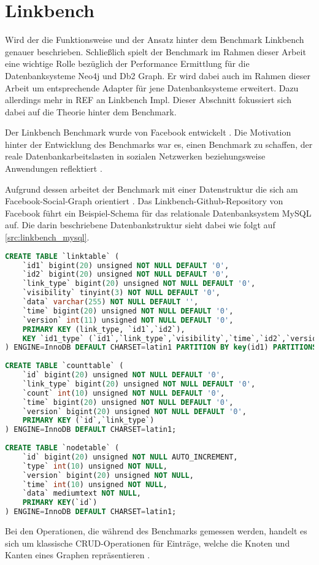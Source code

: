\section{Linkbench}

Wird der die Funktionsweise und der Ansatz hinter dem Benchmark Linkbench genauer beschrieben. Schließlich spielt der Benchmark im Rahmen dieser Arbeit eine wichtige Rolle bezüglich der Performance Ermittlung für die Datenbanksysteme Neo4j und Db2 Graph. Er wird dabei auch im Rahmen dieser Arbeit um entsprechende Adapter für jene Datenbanksysteme erweitert. Dazu allerdings mehr in REF an Linkbench Impl. Dieser Abschnitt fokussiert sich dabei auf die Theorie hinter dem Benchmark. 

Der Linkbench Benchmark wurde von Facebook entwickelt \cite{linkbench_paper}. Die Motivation hinter der Entwicklung des Benchmarks war es, einen Benchmark zu schaffen, der reale Datenbankarbeitslasten in sozialen Netzwerken beziehungsweise Anwendungen reflektiert \cite{linkbench_paper}. 

Aufgrund dessen arbeitet der Benchmark mit einer Datenstruktur die sich am Facebook-Social-Graph orientiert \cite{linkbench_paper}. Das Linkbench-Github-Repository von Facebook führt ein Beispiel-Schema für das relationale Datenbanksystem MySQL auf. Die darin beschriebene Datenbankstruktur sieht dabei wie folgt auf \autoref{src:linkbench_mysql}. 

\begin{lstlisting}[caption={Linkbench MySQL-Schema},language=SQL,label=src:linkbench_mysql]
CREATE TABLE `linktable` (
    `id1` bigint(20) unsigned NOT NULL DEFAULT '0',
    `id2` bigint(20) unsigned NOT NULL DEFAULT '0',
    `link_type` bigint(20) unsigned NOT NULL DEFAULT '0',
    `visibility` tinyint(3) NOT NULL DEFAULT '0',
    `data` varchar(255) NOT NULL DEFAULT '',
    `time` bigint(20) unsigned NOT NULL DEFAULT '0',
    `version` int(11) unsigned NOT NULL DEFAULT '0',
    PRIMARY KEY (link_type, `id1`,`id2`),
    KEY `id1_type` (`id1`,`link_type`,`visibility`,`time`,`id2`,`version`,`data`)
) ENGINE=InnoDB DEFAULT CHARSET=latin1 PARTITION BY key(id1) PARTITIONS 16;
    
CREATE TABLE `counttable` (
    `id` bigint(20) unsigned NOT NULL DEFAULT '0',
    `link_type` bigint(20) unsigned NOT NULL DEFAULT '0',
    `count` int(10) unsigned NOT NULL DEFAULT '0',
    `time` bigint(20) unsigned NOT NULL DEFAULT '0',
    `version` bigint(20) unsigned NOT NULL DEFAULT '0',
    PRIMARY KEY (`id`,`link_type`)
) ENGINE=InnoDB DEFAULT CHARSET=latin1;
    
CREATE TABLE `nodetable` (
    `id` bigint(20) unsigned NOT NULL AUTO_INCREMENT,
    `type` int(10) unsigned NOT NULL,
    `version` bigint(20) unsigned NOT NULL,
    `time` int(10) unsigned NOT NULL,
    `data` mediumtext NOT NULL,
    PRIMARY KEY(`id`)
) ENGINE=InnoDB DEFAULT CHARSET=latin1;
\end{lstlisting}

Bei den Operationen, die während des Benchmarks gemessen werden, handelt es sich um klassische CRUD-Operationen für Einträge, welche die Knoten und Kanten eines Graphen repräsentieren \cite{linkbench_paper}.

